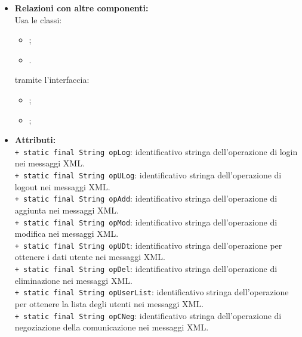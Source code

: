 {{\begin{sloppypar}
{{{\begin{itemize}
			\item[] \textbf{Relazioni con altre componenti:}\\
				Usa le classi:
				\begin{itemize}
					\item[] ;
					\item[] .
				\end{itemize}
				tramite l'interfaccia:
				\begin{itemize}
					\item[] ;
					\item[] ;\\
				\end{itemize}
				
				\item[] \textbf{Attributi:}{\\
					\texttt{+ static final String opLog}: identificativo stringa dell'operazione di login nei messaggi XML\g.\\
					
					\texttt{+ static final String opULog}: identificativo stringa dell'operazione di logout nei messaggi XML\g.\\
					
					\texttt{+ static final String opAdd}: identificativo stringa dell'operazione di aggiunta nei messaggi XML\g.\\
					
					\texttt{+ static final String opMod}: identificativo stringa dell'operazione di modifica nei messaggi XML\g.\\
					
					\texttt{+ static final String opUDt}: identificativo stringa dell'operazione per ottenere i dati utente nei messaggi XML\g.\\
					
					\texttt{+ static final String opDel}: identificativo stringa dell'operazione di eliminazione nei messaggi XML\g.\\
					
					\texttt{+ static final String opUserList}: identificativo stringa dell'operazione per ottenere la lista degli utenti nei messaggi XML\g.\\
					
					\texttt{+ static final String opCNeg}: identificativo stringa dell'operazione di negoziazione della comunicazione nei messaggi XML\g.\\
					
}
\end{itemize}}}}
\end{sloppypar}}}
